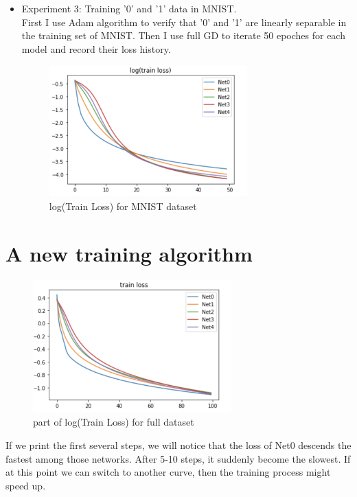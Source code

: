 \begin{enumerate}
\begin{itemize}
	    \item Experiment 3: Training '0' and '1' data in MNIST.\\
	     First I use Adam algorithm to verify that '0' and '1' are linearly separable in the training set of MNIST. Then I use full GD to iterate 50 epoches for each model and record their loss history. 
	    \begin{figure}[H]
		  \centering
		  \includegraphics[width=3in]{figure/log_MNIST_50.png}   
		  \caption{log(Train Loss) for MNIST dataset}
	      \end{figure}
		\end{itemize}
	\end{enumerate}

		
     
	
	





\newpage
\section{A new training algorithm}
\begin{figure}[H]
	\centering
	\includegraphics[width=3in]{figure/part_logGDfullL.png}   
	\caption{part of log(Train Loss) for full dataset}
\end{figure}

If we print the first several steps, we will notice that the loss of Net0 descends the fastest among those networks. After 5-10 steps, it suddenly become the slowest. If at this point we can switch to another curve, then the training process might speed up.\\

